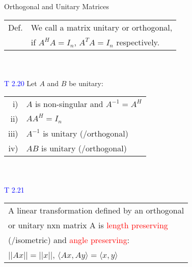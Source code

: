 \begin{mainbox}{Orthogonal and Unitary Matrices}
\begin{tabular}{ll}
	Def. & We call a matrix unitary or orthogonal, \\
	& if $A^HA = I_n$, $A^TA = I_n$ respectively.\\
\end{tabular}\\
\smallskip\\
\textcolor{blue}{T 2.20} Let $A$ and $B$ be unitary:\\
\begin{tabular}{rl}
	i) & $A$ is non-singular and $A^{-1} = A^H$\\
	ii) & $AA^H = I_n$\\
	iii) & $A^{-1}$ is unitary (/orthogonal)\\
	iv) & $AB$ is unitary (/orthogonal)\\
\end{tabular}\\
\smallskip\\
\textcolor{blue}{T 2.21}\\
\begin{tabular}{l}
	A linear transformation defined by an orthogonal\\
	or unitary nxn matrix A is \textcolor{red}{length preserving} \\
	(/isometric) and \textcolor{red}{angle preserving}:\\
	$||Ax|| = ||x||$, $\langle Ax,Ay\rangle = \langle x,y\rangle$\\
\end{tabular}
\end{mainbox}

